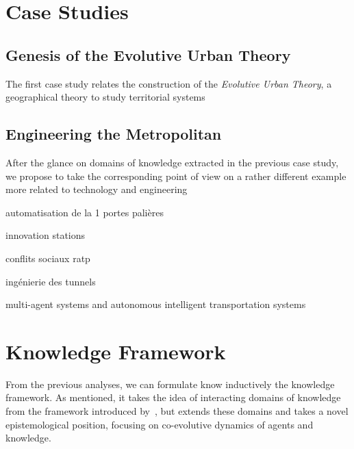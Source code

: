 \documentclass[runningheads,a4paper]{llncs2e/llncs}
\begin{document}
\cite{raimbault:halshs-01505084}






\section{Case Studies}


\subsection{Genesis of the Evolutive Urban Theory}

The first case study relates the construction of the \emph{Evolutive Urban Theory}, a geographical theory to study territorial systems

\cite{legavre1996neutralite} %



\subsection{Engineering the Metropolitan}

After the glance on domains of knowledge extracted in the previous case study, we propose to take the corresponding point of view on a rather different example more related to technology and engineering


\cite{belmonte2008automatisation} automatisation de la 1 \cite{foot2005faut} portes palières

\cite{hatchuel1988stations} innovation stations

\cite{foot1994ratp} conflits sociaux ratp

\cite{moreno2016etude} ingénierie des tunnels

\cite{balbo2016positionnement} multi-agent systems and autonomous intelligent transportation systems



\section{Knowledge Framework}


From the previous analyses, we can formulate know inductively the knowledge framework. As mentioned, it takes the idea of interacting domains of knowledge from the framework introduced by~\cite{livet2010}, but extends these domains and takes a novel epistemological position, focusing on co-evolutive dynamics of agents and knowledge.
\end{document}
